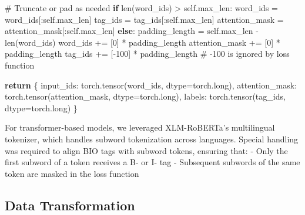 \documentclass[
]{article}
\newenvironment{Shaded}{\begin{snugshade}}{\end{snugshade}}
\newcommand{\BuiltInTok}[1]{\textcolor[rgb]{0.00,0.23,0.31}{#1}}
\newcommand{\CommentTok}[1]{\textcolor[rgb]{0.37,0.37,0.37}{#1}}
\newcommand{\ControlFlowTok}[1]{\textcolor[rgb]{0.00,0.23,0.31}{\textbf{#1}}}
\newcommand{\DecValTok}[1]{\textcolor[rgb]{0.68,0.00,0.00}{#1}}
\newcommand{\NormalTok}[1]{\textcolor[rgb]{0.00,0.23,0.31}{#1}}
\newcommand{\OperatorTok}[1]{\textcolor[rgb]{0.37,0.37,0.37}{#1}}
\newcommand{\StringTok}[1]{\textcolor[rgb]{0.13,0.47,0.30}{#1}}
\newcommand{\VariableTok}[1]{\textcolor[rgb]{0.07,0.07,0.07}{#1}}
\begin{document}
\begin{Shaded}
\begin{Highlighting}[]
        \CommentTok{\# Truncate or pad as needed}
        \ControlFlowTok{if} \BuiltInTok{len}\NormalTok{(word\_ids) }\OperatorTok{\textgreater{}} \VariableTok{self}\NormalTok{.max\_len:}
\NormalTok{            word\_ids }\OperatorTok{=}\NormalTok{ word\_ids[:}\VariableTok{self}\NormalTok{.max\_len]}
\NormalTok{            tag\_ids }\OperatorTok{=}\NormalTok{ tag\_ids[:}\VariableTok{self}\NormalTok{.max\_len]}
\NormalTok{            attention\_mask }\OperatorTok{=}\NormalTok{ attention\_mask[:}\VariableTok{self}\NormalTok{.max\_len]}
        \ControlFlowTok{else}\NormalTok{:}
\NormalTok{            padding\_length }\OperatorTok{=} \VariableTok{self}\NormalTok{.max\_len }\OperatorTok{{-}} \BuiltInTok{len}\NormalTok{(word\_ids)}
\NormalTok{            word\_ids }\OperatorTok{+=}\NormalTok{ [}\DecValTok{0}\NormalTok{] }\OperatorTok{*}\NormalTok{ padding\_length}
\NormalTok{            attention\_mask }\OperatorTok{+=}\NormalTok{ [}\DecValTok{0}\NormalTok{] }\OperatorTok{*}\NormalTok{ padding\_length}
\NormalTok{            tag\_ids }\OperatorTok{+=}\NormalTok{ [}\OperatorTok{{-}}\DecValTok{100}\NormalTok{] }\OperatorTok{*}\NormalTok{ padding\_length  }\CommentTok{\# {-}100 is ignored by loss function}
        
        \ControlFlowTok{return}\NormalTok{ \{}
            \StringTok{\textquotesingle{}input\_ids\textquotesingle{}}\NormalTok{: torch.tensor(word\_ids, dtype}\OperatorTok{=}\NormalTok{torch.}\BuiltInTok{long}\NormalTok{),}
            \StringTok{\textquotesingle{}attention\_mask\textquotesingle{}}\NormalTok{: torch.tensor(attention\_mask, dtype}\OperatorTok{=}\NormalTok{torch.}\BuiltInTok{long}\NormalTok{),}
            \StringTok{\textquotesingle{}labels\textquotesingle{}}\NormalTok{: torch.tensor(tag\_ids, dtype}\OperatorTok{=}\NormalTok{torch.}\BuiltInTok{long}\NormalTok{)}
\NormalTok{        \}}
\end{Highlighting}
\end{Shaded}

For transformer-based models, we leveraged XLM-RoBERTa's multilingual
tokenizer, which handles subword tokenization across languages. Special
handling was required to align BIO tags with subword tokens, ensuring
that: - Only the first subword of a token receives a B- or I- tag -
Subsequent subwords of the same token are masked in the loss function

\subsection{Data Transformation}\label{data-transformation}
\end{document}
